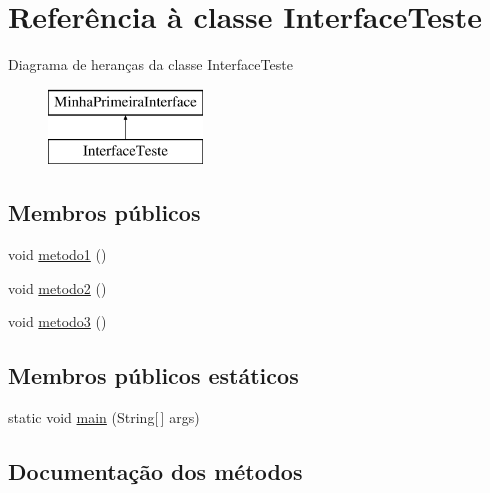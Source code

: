 \hypertarget{class_interface_teste}{}\section{Referência à classe Interface\+Teste}
\label{class_interface_teste}
Diagrama de heranças da classe Interface\+Teste\begin{figure}[H]
\begin{center}
\leavevmode
\includegraphics[height=2.000000cm]{class_interface_teste}
\end{center}
\end{figure}
\subsection*{Membros públicos}
\begin{DoxyCompactItemize}
\item 
void \hyperlink{class_interface_teste_a6b6f074e45a07ce51474f4e8cbcb4787}{metodo1} ()
\item 
void \hyperlink{class_interface_teste_a3dd6ee8d550dacfab9ca0895ddf61468}{metodo2} ()
\item 
void \hyperlink{class_interface_teste_a792ff1fc8b64a4ea9c4971e61281142d}{metodo3} ()
\end{DoxyCompactItemize}
\subsection*{Membros públicos estáticos}
\begin{DoxyCompactItemize}
\item 
static void \hyperlink{class_interface_teste_aa58262630a6bf9cf7154c1073d3418e4}{main} (String\mbox{[}$\,$\mbox{]} args)
\end{DoxyCompactItemize}


\subsection{Documentação dos métodos}
\hypertarget{class_interface_teste_aa58262630a6bf9cf7154c1073d3418e4}{}\label{class_interface_teste_aa58262630a6bf9cf7154c1073d3418e4} 
